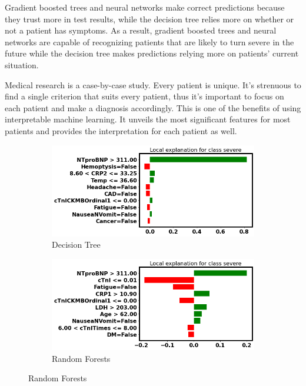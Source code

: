 Gradient boosted trees and neural networks make correct predictions because they trust more in test results, while the decision tree relies more on whether or not a patient has symptoms. As a result, gradient boosted trees and neural networks are capable of recognizing patients that are likely to turn severe in the future while the decision tree makes predictions relying more on patients' current situation.

Medical research is a case-by-case study. Every patient is unique. It's strenuous to find a single criterion that suits every patient, thus it's important to focus on each patient and make a diagnosis accordingly. This is one of the benefits of using interpretable machine learning. It unveils the most significant features for most patients and provides the interpretation for each patient as well.

\clearpage

\null
\vfill

\begin{figure}[H]
\centering
\begin{subfigure}[b]{\textwidth}
    \centering
    \includegraphics[width=\textwidth]{figures/chapter_interp/lime_dt_5.png}
    \caption{Decision Tree}
    \label{fig:lime_dt_5}
\end{subfigure}
\hfill
\begin{subfigure}[b]{\textwidth}
    \centering
    \includegraphics[width=\textwidth]{figures/chapter_interp/lime_rf_5.png}
    \caption{Random Forests}
    \label{fig:lime_rf_5}
\end{subfigure}
\hfill
\end{figure}

